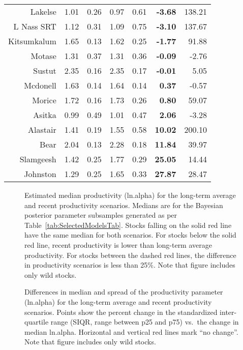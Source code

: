 \documentclass[french,11pt]{book}
\begin{document}
\begin{longtable}[t]{rrrrr>{}rr}
\midrule Lakelse & 1.01 & 0.26 & 0.97 & 0.61 & \textbf{-3.68} & 138.21\\ L Nass SRT & 1.12 & 0.31 & 1.09 & 0.75 & \textbf{-3.10} & 137.67\\ Kitsumkalum & 1.65 & 0.13 & 1.62 & 0.25 & \textbf{-1.77} & 91.88\\ Motase & 1.31 & 0.37 & 1.31 & 0.36 & \textbf{-0.09} & -2.76\\ Sustut & 2.35 & 0.16 & 2.35 & 0.17 & \textbf{-0.01} & 5.05\\ Mcdonell & 1.63 & 0.14 & 1.64 & 0.14 & \textbf{0.37} & -0.57\\ Morice & 1.72 & 0.16 & 1.73 & 0.26 & \textbf{0.80} & 59.07\\ Asitka & 0.99 & 0.49 & 1.01 & 0.47 & \textbf{2.06} & -3.28\\
\midrule Alastair & 1.41 & 0.19 & 1.55 & 0.58 & \textbf{10.02} & 200.10\\ Bear & 2.04 & 0.13 & 2.28 & 0.18 & \textbf{11.84} & 39.97\\ Slamgeesh & 1.42 & 0.25 & 1.77 & 0.29 & \textbf{25.05} & 14.44\\ Johnston & 1.29 & 0.25 & 1.65 & 0.33 & \textbf{27.87} & 28.47\\* \end{longtable}

\endgroup{} \endgroup{}

\clearpage


\begin{figure}[htb]

{\centering {} 

}

\caption{Estimated median productivity (ln.alpha) for the long-term average and recent productivity scenarios. Medians are for the Bayesian posterior parameter subsamples generated as per Table~\ref{tab:SelectedModelsTab}. Stocks falling on the solid red line have the same median for both scenarios. For stocks below the solid red line, recent productivity is lower than long-term average productivity. For stocks between the dashed red lines, the difference in productivity scenarios is less than 25\%. Note that figure includes only wild stocks.}\label{fig:ProdComp1}
\end{figure}
\clearpage


\begin{figure}[htb]

{\centering {} 

}

\caption{Differences in median and spread of the productivity parameter (ln.alpha) for the long-term average and recent productivity scenarios. Points show the percent change in the standardized inter-quartile range (SIQR, range between p25 and p75) vs.~the change in median ln.alpha. Horizontal and vertical red lines mark ``no change''. Note that figure includes only wild stocks.}\label{fig:ProdComp2}
\end{figure}
\clearpage
\end{document}
